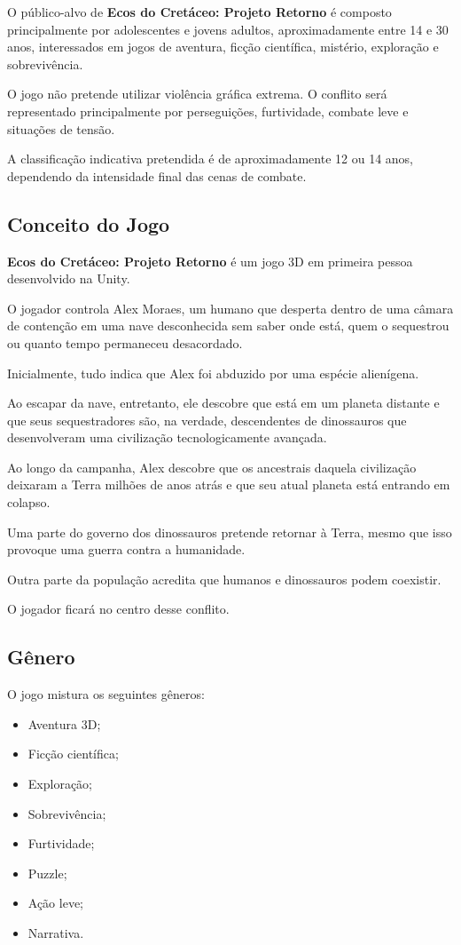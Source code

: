 \documentclass[12pt,a4paper]{article}
\newcommand{\jogo}{\textbf{Ecos do Cretáceo: Projeto Retorno}}
\begin{document}
O público-alvo de \jogo{} é composto principalmente por adolescentes
e jovens adultos, aproximadamente entre 14 e 30 anos, interessados em
jogos de aventura, ficção científica, mistério, exploração e
sobrevivência.

O jogo não pretende utilizar violência gráfica extrema. O conflito
será representado principalmente por perseguições, furtividade,
combate leve e situações de tensão.

A classificação indicativa pretendida é de aproximadamente 12 ou
14 anos, dependendo da intensidade final das cenas de combate.

\subsection{Conceito do Jogo}

\jogo{} é um jogo 3D em primeira pessoa desenvolvido na Unity.

O jogador controla Alex Moraes, um humano que desperta dentro de uma
câmara de contenção em uma nave desconhecida sem saber onde está,
quem o sequestrou ou quanto tempo permaneceu desacordado.

Inicialmente, tudo indica que Alex foi abduzido por uma espécie
alienígena.

Ao escapar da nave, entretanto, ele descobre que está em um planeta
distante e que seus sequestradores são, na verdade, descendentes de
dinossauros que desenvolveram uma civilização tecnologicamente
avançada.

Ao longo da campanha, Alex descobre que os ancestrais daquela
civilização deixaram a Terra milhões de anos atrás e que seu atual
planeta está entrando em colapso.

Uma parte do governo dos dinossauros pretende retornar à Terra,
mesmo que isso provoque uma guerra contra a humanidade.

Outra parte da população acredita que humanos e dinossauros podem
coexistir.

O jogador ficará no centro desse conflito.

\subsection{Gênero}

O jogo mistura os seguintes gêneros:

\begin{itemize}
    \item Aventura 3D;
    \item Ficção científica;
    \item Exploração;
    \item Sobrevivência;
    \item Furtividade;
    \item Puzzle;
    \item Ação leve;
    \item Narrativa.
\end{itemize}
\end{document}

